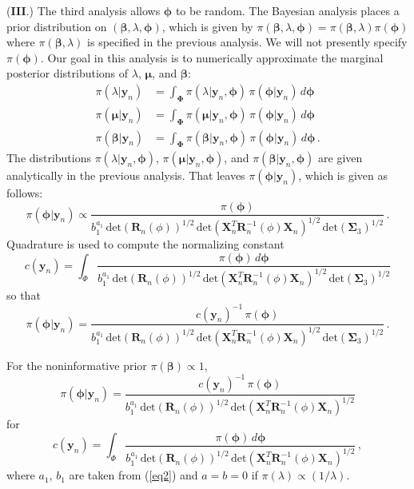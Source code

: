 \documentclass[11pt, oneside]{article}   	%
\begin{document}
({\bf III}.)  The third analysis allows $\mathbf{\phi}$ to be random.  The Bayesian analysis places a prior distribution on $(\mathbf{\beta}, \lambda, \mathbf{\phi})$, which is given by $\pi(\mathbf{\beta}, \lambda, \mathbf{\phi}) = \pi(\mathbf{\beta}, \lambda) \pi(\mathbf{\phi})$ where $\pi(\mathbf{\beta}, \lambda)$ is specified in the previous analysis.  We will not presently specify $\pi(\mathbf{\phi})$.  Our goal in this analysis is to numerically approximate the marginal posterior distributions of $\lambda$, $\mathbf{\mu}$, and $\mathbf{\beta}$:
\begin{align*}
\pi(\lambda | \mathbf{y}_n ) & = \int_\mathbf{\Phi} \pi(\lambda | \mathbf{y}_n, \mathbf{\phi}) \, \pi(\mathbf{\phi} | \mathbf{y}_n) \, d\mathbf{\phi} \\[1ex]
\pi(\mathbf{\mu} | \mathbf{y}_n ) & = \int_\mathbf{\Phi} \pi(\mathbf{\mu} | \mathbf{y}_n, \mathbf{\phi}) \, \pi(\mathbf{\phi} | \mathbf{y}_n) \, d\mathbf{\phi} \\[1ex]
\pi(\mathbf{\beta} | \mathbf{y}_n ) & = \int_\mathbf{\Phi} \pi(\mathbf{\beta} | \mathbf{y}_n, \mathbf{\phi}) \, \pi(\mathbf{\phi} | \mathbf{y}_n) \, d\mathbf{\phi} \,.
\end{align*}
The distributions $\pi(\lambda | \mathbf{y}_n, \mathbf{\phi})$, $\pi(\mathbf{\mu} | \mathbf{y}_n, \mathbf{\phi})$, and $\pi(\mathbf{\beta} | \mathbf{y}_n, \mathbf{\phi})$ are given analytically in the previous analysis.  That leaves $\pi(\mathbf{\phi} | \mathbf{y}_n)$, which is given as follows:
\[
\pi(\mathbf{\phi} | \mathbf{y}_n) \propto \frac{\pi(\mathbf{\phi})}{b_1^{a_1} \,\mbox{det}(\mathbf{R}_n(\phi))^{1/2} \, \mbox{det}(\mathbf{X}_n^T \mathbf{R}_n^{-1}(\phi) \mathbf{X}_n)^{1/2} \, \mbox{det}(\mathbf{\Sigma}_3)^{1/2}} \,.
\]
Quadrature is used to compute the normalizing constant
\[
c(\mathbf{y}_n) = \int_{\Phi} \frac{\pi(\mathbf{\phi}) \, d \mathbf{\phi}}{b_1^{a_1} \,\mbox{det}(\mathbf{R}_n(\phi))^{1/2} \, \mbox{det}(\mathbf{X}_n^T \mathbf{R}_n^{-1}(\phi) \mathbf{X}_n)^{1/2} \, \mbox{det}(\mathbf{\Sigma}_3)^{1/2}}
\]
so that
\[
\pi(\mathbf{\phi} | \mathbf{y}_n) = \frac{c(\mathbf{y}_n)^{-1} \, \pi(\mathbf{\phi})}{b_1^{a_1} \,\mbox{det}(\mathbf{R}_n(\phi))^{1/2} \, \mbox{det}(\mathbf{X}_n^T \mathbf{R}_n^{-1}(\phi) \mathbf{X}_n)^{1/2} \, \mbox{det}(\mathbf{\Sigma}_3)^{1/2}} \,.
\]

For the noninformative prior $\pi(\mathbf{\beta}) \propto 1$,
\[
\pi(\mathbf{\phi} | \mathbf{y}_n) = \frac{c(\mathbf{y}_n)^{-1} \, \pi(\mathbf{\phi})}{b_1^{a_1} \,\mbox{det}(\mathbf{R}_n(\phi))^{1/2} \, \mbox{det}(\mathbf{X}_n^T \mathbf{R}_n^{-1}(\phi) \mathbf{X}_n)^{1/2}}
\]
for
\[
c(\mathbf{y}_n) = \int_{\Phi} \frac{\pi(\mathbf{\phi}) \, d \mathbf{\phi}}{b_1^{a_1} \,\mbox{det}(\mathbf{R}_n(\phi))^{1/2} \, \mbox{det}(\mathbf{X}_n^T \mathbf{R}_n^{-1}(\phi) \mathbf{X}_n)^{1/2}} \,,
\]
where $a_1$, $b_1$ are taken from (\ref{eq2}) and $a = b = 0$ if $\pi(\lambda) \propto (1/\lambda)$. 
\end{document}
